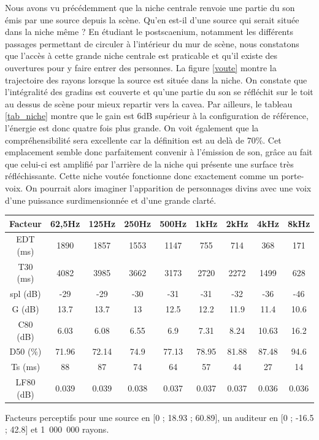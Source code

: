 Nous avons vu précédemment que la niche centrale renvoie une partie du son émis par une source depuis la scène. Qu'en est-il d'une source qui serait située dans la niche même ? En étudiant le \gls{postscaenium}, notamment les différents passages permettant de circuler à l'intérieur du mur de scène, nous constatons que l'accès à cette grande niche centrale est praticable et qu'il existe des ouvertures pour y faire entrer des personnes. La figure \ref{voute} montre la trajectoire des rayons lorsque la source est située dans la niche. On constate que l'intégralité des gradins est couverte et qu'une partie du son se réfléchit sur le toit au dessus de scène pour mieux repartir vers la \gls{cavea}. Par ailleurs, le tableau \ref{tab_niche} montre que le gain est 6dB supérieur à la configuration de référence, l'énergie est donc quatre fois plus grande. On voit également que la compréhensibilité sera excellente car la définition est au delà de 70\%. Cet emplacement semble donc parfaitement convenir à l'émission de son, grâce au fait que celui-ci est amplifié par l'arrière de la niche qui présente une surface très réfléchissante. Cette niche voutée fonctionne donc exactement comme un porte-voix. On pourrait alors imaginer l'apparition de personnages divins \cite[p.12]{vitruve} avec une voix d'une puissance surdimensionnée et d'une grande clarté.

\begin{tableth} 
 \begin{tabular}{| *{9}{c|}} 
 \hline 
 Facteur & 62,5Hz & 125Hz & 250Hz & 500Hz & 1kHz & 2kHz & 4kHz & 8kHz \\ 
 \hline 
 \hline 
\gls{EDT} (ms)& 1890& 1857& 1553& 1147& 755& 714& 368& 171 \\ 
 \hline 
\gls{T30} (ms)& 4082& 3985& 3662& 3173& 2720& 2272& 1499& 628 \\ 
 \hline 
\gls{spl} (dB)& -29& -29& -30& -31& -31& -32& -36& -46 \\ 
 \hline 
\gls{G} (dB)& 13.7& 13.7& 13& 12.5& 12.2& 11.9& 11.4& 10.6 \\ 
 \hline 
\gls{C80} (dB)& 6.03& 6.08& 6.55& 6.9& 7.31& 8.24& 10.63& 16.2 \\ 
 \hline 
\gls{D50} (\%)& 71.96& 72.14& 74.9& 77.13& 78.95& 81.88& 87.48& 94.6 \\ 
 \hline 
\gls{Ts} (ms)& 88& 87& 74& 64& 57& 44& 27& 14 \\ 
 \hline 
\gls{LF80} (dB)& 0.039& 0.039& 0.038& 0.037& 0.037& 0.037& 0.036& 0.036 \\ 
 \hline 
\end{tabular} 
 \caption{Facteurs perceptifs pour une source en [0 ; 18.93 ; 60.89], un auditeur en [0 ; -16.5 ; 42.8] et 1~000~000 rayons.} 
 \label{tab_niche} 
 \end{tableth}

